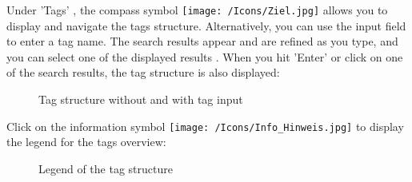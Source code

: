 Under 'Tags' , the compass symbol \texttt{[image: /Icons/Ziel.jpg]}  allows you to display and navigate the tags structure. Alternatively, you can use the input field  to enter a tag name. The search results appear and are refined as you type, and you can select one of the displayed results . When you hit 'Enter' or click on one of the search results, the tag structure is also displayed:

\begin{figure}[H]
\caption{Tag structure without and with tag input}
\end{figure}

Click on the information symbol \texttt{[image: /Icons/Info\_Hinweis.jpg]}  to display the legend for the tags overview:

\begin{figure}[H]
\caption{Legend of the tag structure}
\end{figure}

